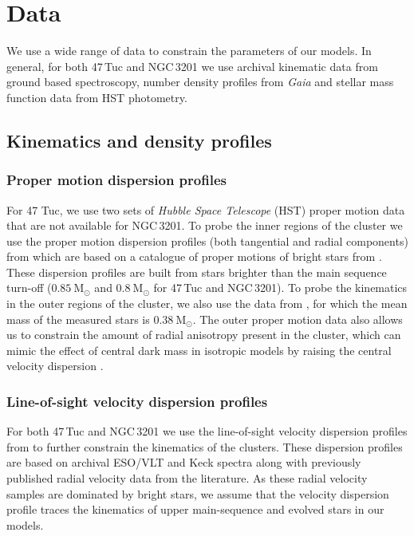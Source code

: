 \newcommand{\evolvemf}{\code{evolve\_mf}}



\section{Data}

We use a wide range of data to constrain the parameters of our models. In general, for both 47\,Tuc
and NGC\,3201 we use archival kinematic data from ground based spectroscopy, number density profiles from
\emph{Gaia} and stellar mass function data from HST photometry.

\subsection{Kinematics and density profiles}

\subsubsection{Proper motion dispersion profiles}

For 47 Tuc, we use two sets of {\it Hubble Space Telescope} (HST) proper motion data that are not
available for NGC\,3201. To probe the inner regions of the cluster we use the proper motion
dispersion profiles (both tangential and radial components) from \citet{Watkins2015} which are based
on a catalogue of proper motions of bright stars from \citet{Bellini2014}. These dispersion profiles
are built from stars brighter than the main sequence turn-off ($0.85 \ \mathrm{M}_\odot$ and $0.8 \
	\mathrm{M}_\odot$ for 47\,Tuc and NGC\,3201). To probe the kinematics in the outer regions of the
cluster, we also use the data from \citet{Heyl2017}, for which the mean mass of the measured stars
is $0.38 \ \mathrm{M}_{\odot}$. The outer proper motion data also allows us to constrain the amount
of radial anisotropy present in the cluster, which can mimic the effect of central dark mass in
isotropic models by raising the central velocity dispersion \citep{Zocchi2017}.


\subsubsection{Line-of-sight velocity dispersion profiles}

For both 47\,Tuc and NGC\,3201 we use the line-of-sight velocity dispersion profiles from
\citet{Baumgardt2018} to further constrain the kinematics of the clusters. These dispersion profiles
are based on archival ESO/VLT and Keck spectra along with previously published radial velocity data
from the literature. As these radial velocity samples are dominated by bright stars, we assume that
the velocity dispersion profile traces the kinematics of upper main-sequence and evolved stars in
our models.

